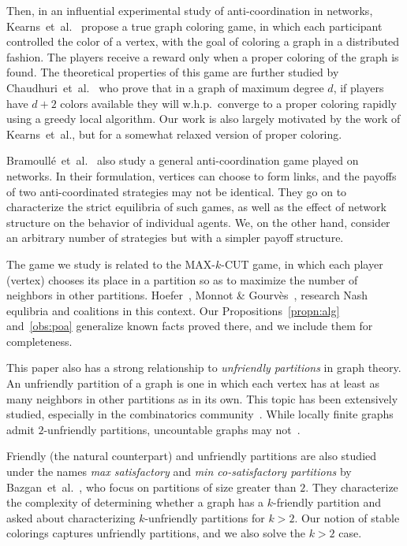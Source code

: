 \documentclass{llncs}
\begin{document}
Then, in an influential experimental study of anti-coordination in networks,
Kearns~et~al.~\cite{KearnsSM06} propose a true graph coloring game, in which
each participant controlled the color of a vertex, with the goal of coloring a
graph in a distributed fashion.  The players receive a reward only when a proper
coloring of the graph is found.  The theoretical properties of this game are
further studied by Chaudhuri~et~al.~\cite{ChaudhuriGJ08} who prove that in a
graph of maximum degree $d$, if players have $d + 2$ colors available they will
w.h.p.\ converge to a proper coloring rapidly using a greedy local algorithm.
Our work is also largely motivated by the work of Kearns~et~al., but for a
somewhat relaxed version of proper coloring.

Bramoull\'{e}~et~al.~\cite{BramoulleLGV04} also study a general
anti-coordination game played on networks.  In their formulation, vertices can
choose to form links, and the payoffs of two anti-coordinated strategies may not
be identical.  They go on to characterize the strict equilibria of such games,
as well as the effect of network structure on the behavior of individual agents.
We, on the other hand, consider an arbitrary number of strategies but with a
simpler payoff structure.

The game we study is related to the MAX-$k$-CUT game, in which each player
(vertex) chooses its place in a partition so as to maximize the number of
neighbors in other partitions. Hoefer~\cite{Hoefer2007}, Monnot \&
Gourv\`es~\cite{G09}, research Nash equlibria and coalitions in this context.
Our Propositions~\ref{propn:alg} and~\ref{obs:poa} generalize known facts proved
there, and we include them for completeness.

This paper also has a strong relationship to \emph{unfriendly partitions} in
graph theory.  An unfriendly partition of a graph is one in which each vertex
has at least as many neighbors in other partitions as in its own.  This topic
has been extensively studied, especially in the combinatorics
community~\cite{AharoniMP90,BruhnDGS10,CowanE,ShelahM90}.  While locally finite
graphs admit $2$-unfriendly partitions, uncountable graphs may
not~\cite{ShelahM90}.

Friendly (the natural counterpart) and unfriendly partitions are also studied
under the names \emph{max satisfactory} and \emph{min co-satisfactory
partitions} by Bazgan~et~al.~\cite{BazganTV10}, who focus on partitions of size
greater than $2$.  They characterize the complexity of determining whether a
graph has a $k$-friendly partition and asked about characterizing $k$-unfriendly
partitions for $k > 2$.  Our notion of stable colorings captures unfriendly
partitions, and we also solve the $k>2$ case.
\end{document}
